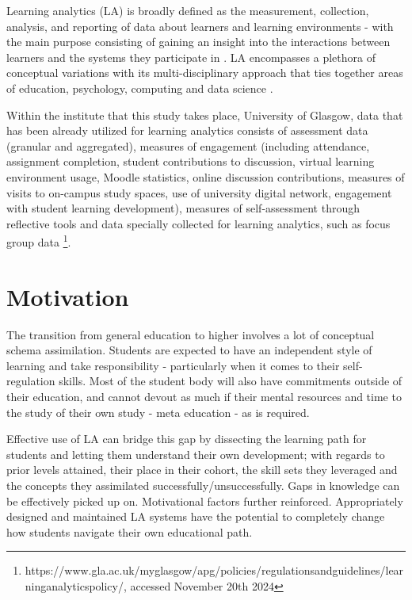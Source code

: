 \documentclass{l4proj}
\begin{document}

Learning analytics (LA) is broadly defined as the measurement, collection, analysis, and reporting of data about learners and learning environments - with the main purpose consisting of gaining an insight into the interactions between learners and the systems they participate in \citep{Papamitsiou2014InternationalEvidence}. LA encompasses a plethora of conceptual variations with its multi-disciplinary approach that ties together areas of education, psychology, computing and data science \citep{Ifenthaler2020UtilisingReview}.  

Within the institute that this study takes place, University of Glasgow, data that has been already utilized for learning analytics consists of assessment data (granular and aggregated), measures of engagement (including attendance, assignment completion, student contributions to discussion, virtual learning environment usage, Moodle statistics, online discussion contributions, measures of visits to on-campus study spaces, use of university digital network, engagement with student learning development), measures of self-assessment through reflective tools and data specially collected for learning analytics, such as focus group data \footnote{https://www.gla.ac.uk/myglasgow/apg/policies/regulationsandguidelines/learninganalyticspolicy/, accessed November 20th 2024}. 


\section{Motivation}

The transition from general education to higher involves a lot of conceptual schema assimilation. Students are expected to have an independent style of learning and take responsibility - particularly when it comes to their self-regulation skills. Most of the student body will also have commitments outside of their education, and cannot devout as much if their mental resources and time to the study of their own study - meta education - as is required.

Effective use of LA can bridge this gap by dissecting the learning path for students and letting them understand their own development; with regards to prior levels attained, their place in their cohort, the skill sets they leveraged and the concepts they assimilated successfully/unsuccessfully. Gaps in knowledge can be effectively picked up on. Motivational factors further reinforced. Appropriately designed and maintained LA systems have the potential to completely change how students navigate their own educational path.
\end{document}
